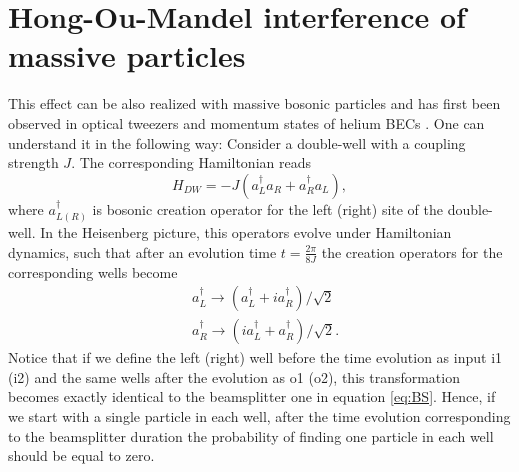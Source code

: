 \section{Hong-Ou-Mandel interference of massive particles}
This effect can be also realized with massive bosonic particles and has first been observed in optical tweezers \cite{Kaufman2014} and momentum states of helium BECs \cite{Lopes2015}. One can understand it in the following way: Consider a double-well with a coupling strength $J$. The corresponding Hamiltonian reads 
\begin{equation}
H_{DW} = -J(a^{\dagger}_L a_R + a^{\dagger}_R a_L),
\end{equation}
where $a^{\dagger}_{L(R)}$ is bosonic creation operator for the left (right) site of the double-well. In the Heisenberg picture, this operators evolve under Hamiltonian dynamics, such that after an evolution time $t= \frac{2 \pi}{8J}$ the creation operators for the corresponding wells become
\begin{equation}
\begin{aligned}
& a_{L}^{\dagger} \rightarrow (a_{L}^{\dagger} +ia_{R}^{\dagger} )/\sqrt{2} \\
& a_{R}^{\dagger} \rightarrow (ia_{L}^{\dagger} +a_{R}^{\dagger} )/\sqrt{2}.
\end{aligned}
\end{equation}
Notice that if we define the left (right) well before the time evolution as input i1 (i2) and the same wells after the evolution as o1 (o2), this transformation becomes exactly identical to the beamsplitter one in equation \ref{eq:BS}. Hence, if we start with a single particle in each well, after the time evolution corresponding to the beamsplitter duration the probability of finding one particle in each well should be equal to zero. 

